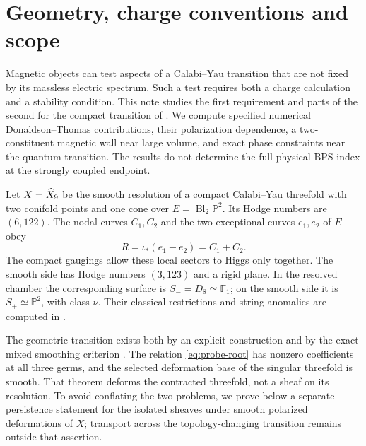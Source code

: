 \section{Geometry, charge conventions and scope}
\label{sec:probe-setup}

Magnetic objects can test aspects of a Calabi--Yau transition
that are not fixed by its massless electric spectrum. Such a
test requires both a charge calculation and a stability
condition. This note studies the first requirement and parts
of the second for the compact transition of
\cite{Wuebben:2026quantum}. We compute specified numerical
Donaldson--Thomas contributions, their polarization
dependence, a two-constituent magnetic wall near large volume,
and exact phase constraints near the quantum transition.
The results do not determine the full physical BPS index at
the strongly coupled endpoint.

Let $X=\widehat X_9$ be the smooth resolution of a compact
Calabi--Yau threefold with two conifold points and one cone
over $E=\operatorname{Bl}_2\mathbb P^2$. Its Hodge numbers
are $(6,122)$. The nodal curves $C_1,C_2$ and the two
exceptional curves $e_1,e_2$ of $E$ obey
\begin{equation}
 R=\iota_*(e_1-e_2)=C_1+C_2.
 \label{eq:probe-root}
\end{equation}
The compact gaugings allow these local sectors to Higgs only
together. The smooth side has Hodge numbers $(3,123)$ and a
rigid plane. In the resolved chamber the corresponding
surface is $S_-=D_8\simeq\mathbb F_1$; on the smooth side
it is $S_+\simeq\mathbb P^2$, with class $\nu$.
Their classical restrictions and string anomalies are computed
in \cite[Section~3]{Wuebben:2026quantum}.

The geometric transition exists both by an explicit construction and by
the exact mixed smoothing criterion
\cite[Theorems~4.7 and~11.8]{Wuebben:2026smoothing}. The relation
\eqref{eq:probe-root} has nonzero coefficients at all three germs, and
the selected deformation base of the singular threefold is smooth.
That theorem deforms the contracted threefold, not a sheaf on its
resolution. To avoid conflating the two problems, we prove below a
separate persistence statement for the isolated sheaves under smooth
polarized deformations of $X$; transport across the topology-changing
transition remains outside that assertion.

